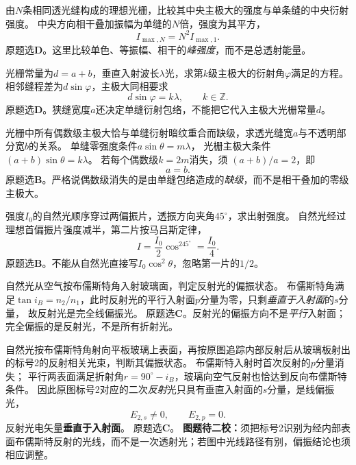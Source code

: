 \problemtext 由$N$条相同透光缝构成的理想光栅，比较其中央主极大的强度与单条缝的中央衍射强度。
\workings
中央方向相干叠加振幅为单缝的$N$倍，强度为其平方，
\[
\boxed{I_{\max,N}=N^2I_{\max,1}}.
\]
原题选\textbf{D}。\crosscheck 这里比较单色、等振幅、相干的\emph{峰强度}，而不是总透射能量。

\problemtext 光栅常量为$d=a+b$，垂直入射波长$\lambda$光，求第$k$级主极大的衍射角$\varphi$满足的方程。
\workings
相邻缝程差为$d\sin\varphi$，主极大同相要求
\[
\boxed{d\sin\varphi=k\lambda},\qquad k\in\mathbb Z.
\]
原题选\textbf{D}。\crosscheck 狭缝宽度$a$还决定单缝衍射包络，不能把它代入主极大光栅常量$d$。

\problemtext 光栅中所有偶数级主极大恰与单缝衍射暗纹重合而缺级，求透光缝宽$a$与不透明部分宽$b$的关系。
\workings
单缝零强度条件$a\sin\theta=m\lambda$，
光栅主极大条件$(a+b)\sin\theta=k\lambda$。
若每个偶数级$k=2m$消失，须
$(a+b)/a=2$，即
\[
\boxed{a=b}.
\]
原题选\textbf{B}。\crosscheck 严格说偶数级消失的是由单缝包络造成的\emph{缺级}，而不是相干叠加的零级主极大。

\problemtext 强度$I_0$的自然光顺序穿过两偏振片，透振方向夹角$45^\circ$，求出射强度。
\workings
自然光经过理想首偏振片强度减半，第二片按马吕斯定律，
\[
\boxed{I=\frac{I_0}{2}\cos^245^\circ=\frac{I_0}{4}}.
\]
原题选\textbf{B}。\crosscheck 不能从自然光直接写$I_0\cos^2\theta$，忽略第一片的$1/2$。

\problemtext 自然光从空气按布儒斯特角入射玻璃面，判定反射光的偏振状态。
\workings
布儒斯特角满足$\tan i_B=n_2/n_1$，此时反射光的平行入射面$p$分量为零，只剩\emph{垂直于入射面}的$s$分量，
故反射光是完全线偏振光。
原题选\textbf{C}。\crosscheck 反射光的偏振方向不是\emph{平行}入射面；完全偏振的是反射光，不是所有折射光。

\problemtext 自然光按布儒斯特角射向平板玻璃上表面，再按原图追踪内部反射后从玻璃板射出的标号2的反射相关光束，判断其偏振状态。
\workings
布儒斯特入射时首次反射的$p$分量消失；
平行两表面满足折射角$r=90^\circ-i_B$，玻璃向空气反射也恰达到反向布儒斯特条件。
因此原图标号2对应的二次\emph{反射}光只具有垂直入射面的$s$分量，是线偏振光，
\[
\boxed{E_{2,s}\ne0,\qquad E_{2,p}=0}.
\]
反射光电矢量\textbf{垂直于入射面}。
原题选\textbf{C}。
\crosscheck \textbf{图题待二校：}须把标号2识别为经内部表面布儒斯特反射的光线，而不是一次透射光；若图中光线路径有别，偏振结论也须相应调整。
